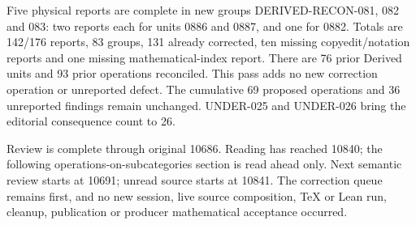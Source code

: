 Five physical reports are complete in new groups DERIVED-RECON-081,\allowbreak{} 082 and 083:\allowbreak{} two reports each for units 0886 and 0887,\allowbreak{} and one for 0882. Totals are 142/\allowbreak{}176 reports,\allowbreak{} 83 groups,\allowbreak{} 131 already corrected,\allowbreak{} ten missing copyedit/\allowbreak{}notation reports and one missing mathematical-index report. There are 76 prior Derived units and 93 prior operations reconciled. This pass adds no new correction operation or unreported defect. The cumulative 69 proposed operations and 36 unreported findings remain unchanged. UNDER-025 and UNDER-026 bring the editorial consequence count to 26.

Review is complete through original 10686. Reading has reached 10840; the following operations-on-subcategories section is read ahead only. Next semantic review starts at 10691; unread source starts at 10841. The correction queue remains first,\allowbreak{} and no new session,\allowbreak{} live source composition,\allowbreak{} TeX or Lean run,\allowbreak{} cleanup,\allowbreak{} publication or producer mathematical acceptance occurred.
